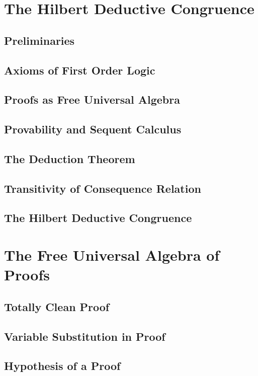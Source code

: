 \section{The Hilbert Deductive Congruence}
    \subsection{Preliminaries}
      
    \subsection{Axioms of First Order Logic}
      
    \subsection{Proofs as Free Universal Algebra}
      
    \subsection{Provability and Sequent Calculus}
      
    \subsection{The Deduction Theorem}
      
    \subsection{Transitivity of Consequence Relation}
      
    \subsection{The Hilbert Deductive Congruence}
      
\section{The Free Universal Algebra of Proofs}
    \subsection{Totally Clean Proof}
      
    \subsection{Variable Substitution in Proof}
      
    \subsection{Hypothesis of a Proof}
      
